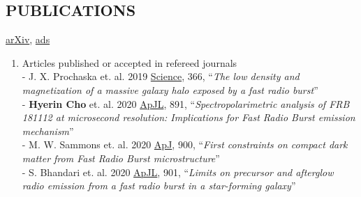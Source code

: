 \documentclass[margin, 10pt]{res} %
\begin{document}
\begin{resume}

\section{PUBLICATIONS}
\href{https://arxiv.org/search/advanced?advanced=&terms-0-operator=AND&terms-0-term=Hyerin+Cho&terms-0-field=author&classification-physics_archives=all&classification-include_cross_list=include&date-filter_by=all_dates&date-year=&date-from_date=&date-to_date=&date-date_type=submitted_date&abstracts=show&size=50&order=-announced_date_first}{arXiv}, \href{https://ui.adsabs.harvard.edu/search/q=orcid\%3A\%220000-0002-2858-9481\%22&sort=date\%20desc\%2C\%20bibcode\%20desc&p_=0}{ads}
\begin{enumerate}
    \item Articles published or accepted in refereed journals\\
    - J. X. Prochaska et. al. 2019 \href{https://science.sciencemag.org/content/366/6462/231/tab-pdf}{Science}, 366, ``{\sl The low density and magnetization of a massive galaxy halo exposed by a fast radio burst}''\\
    - \textbf{Hyerin Cho} et. al. 2020 \href{https://iopscience.iop.org/article/10.3847/2041-8213/ab7824/pdf}{ApJL}, 891, ``{\sl Spectropolarimetric analysis of FRB\,181112 at microsecond resolution: Implications for Fast Radio Burst emission mechanism}''\\
    - M. W. Sammons et. al. 2020 \href{https://iopscience.iop.org/article/10.3847/1538-4357/aba7bb}{ApJ}, 900, ``{\sl First constraints on compact dark matter from Fast Radio Burst microstructure}''\\
    - S. Bhandari et. al. 2020 \href{https://iopscience.iop.org/article/10.3847/2041-8213/abb462}{ApJL}, 901, ``{\sl Limits on precursor and afterglow radio emission from a fast radio burst in a star-forming galaxy}''\\
    

\end{enumerate}
\end{resume}
\end{document}
